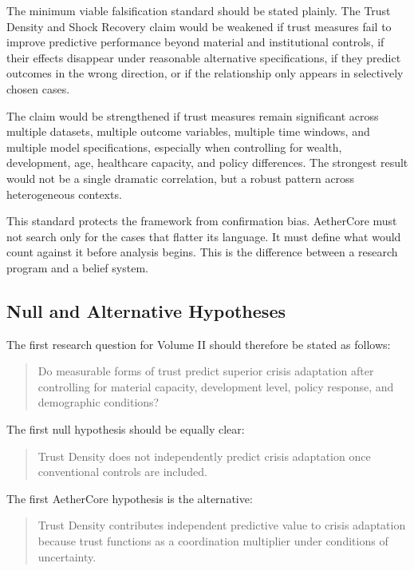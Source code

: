 \documentclass[12pt]{article}
\begin{document}
The minimum viable falsification standard should be stated plainly. The Trust Density and Shock Recovery claim would be weakened if trust measures fail to improve predictive performance beyond material and institutional controls, if their effects disappear under reasonable alternative specifications, if they predict outcomes in the wrong direction, or if the relationship only appears in selectively chosen cases.

The claim would be strengthened if trust measures remain significant across multiple datasets, multiple outcome variables, multiple time windows, and multiple model specifications, especially when controlling for wealth, development, age, healthcare capacity, and policy differences. The strongest result would not be a single dramatic correlation, but a robust pattern across heterogeneous contexts.

This standard protects the framework from confirmation bias. AetherCore must not search only for the cases that flatter its language. It must define what would count against it before analysis begins. This is the difference between a research program and a belief system.

\subsection{Null and Alternative Hypotheses}

The first research question for Volume II should therefore be stated as follows:

\begin{quote}
Do measurable forms of trust predict superior crisis adaptation after controlling for material capacity, development level, policy response, and demographic conditions?
\end{quote}

The first null hypothesis should be equally clear:

\begin{quote}
Trust Density does not independently predict crisis adaptation once conventional controls are included.
\end{quote}

The first AetherCore hypothesis is the alternative:

\begin{quote}
Trust Density contributes independent predictive value to crisis adaptation because trust functions as a coordination multiplier under conditions of uncertainty.
\end{quote}
\end{document}
